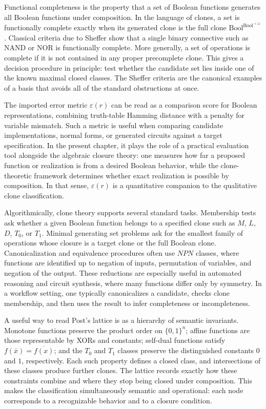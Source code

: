 \documentclass[11pt]{article}
\begin{document}
Functional completeness is the property that a set of Boolean functions generates all Boolean functions under composition. In the language of clones, a set is functionally complete exactly when its generated clone is the full clone \(\mathrm{Bool}^{\mathrm{Bool}^{<\omega}}\). Classical criteria due to Sheffer show that a single binary connective such as NAND or NOR is functionally complete. More generally, a set of operations is complete if it is not contained in any proper precomplete clone. This gives a decision procedure in principle: test whether the candidate set lies inside one of the known maximal closed classes. The Sheffer criteria are the canonical examples of a basis that avoids all of the standard obstructions at once.

The imported error metric \(\varepsilon(r)\) can be read as a comparison score for Boolean representations, combining truth-table Hamming distance with a penalty for variable mismatch. Such a metric is useful when comparing candidate implementations, normal forms, or generated circuits against a target specification. In the present chapter, it plays the role of a practical evaluation tool alongside the algebraic closure theory: one measures how far a proposed function or realization is from a desired Boolean behavior, while the clone-theoretic framework determines whether exact realization is possible by composition. In that sense, \(\varepsilon(r)\) is a quantitative companion to the qualitative clone classification.

Algorithmically, clone theory supports several standard tasks. Membership tests ask whether a given Boolean function belongs to a specified clone such as \(M\), \(L\), \(D\), \(T_0\), or \(T_1\). Minimal generating set problems ask for the smallest family of operations whose closure is a target clone or the full Boolean clone. Canonicalization and equivalence procedures often use \(NPN\) classes, where functions are identified up to negation of inputs, permutation of variables, and negation of the output. These reductions are especially useful in automated reasoning and circuit synthesis, where many functions differ only by symmetry. In a workflow setting, one typically canonicalizes a candidate, checks clone membership, and then uses the result to infer completeness or incompleteness.

A useful way to read Post's lattice is as a hierarchy of semantic invariants. Monotone functions preserve the product order on \(\{0,1\}^n\); affine functions are those representable by XORs and constants; self-dual functions satisfy \(f(\bar{x})=\overline{f(x)}\); and the \(T_0\) and \(T_1\) classes preserve the distinguished constants \(0\) and \(1\), respectively. Each such property defines a closed class, and intersections of these classes produce further clones. The lattice records exactly how these constraints combine and where they stop being closed under composition. This makes the classification simultaneously semantic and operational: each node corresponds to a recognizable behavior and to a closure condition.
\end{document}
